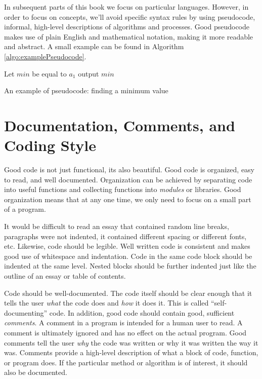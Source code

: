 In subsequent parts of this book we focus on particular languages.  However,
in order to focus on concepts, we'll avoid specific syntax rules by using
\gls{pseudocode}, informal, high-level descriptions of algorithms and 
processes.  Good pseudocode makes use of plain English and mathematical
notation, making it more readable and abstract.  A small example can 
be found in Algorithm \ref{algo:examplePseudocode}.

\begin{algorithm}
Let $min$ be equal to $a_1$ \;
output $min$ \;
\caption{An example of pseudocode: finding a minimum value}
\label{algo:examplePseudocode}
\end{algorithm}

\section{Documentation, Comments, and Coding Style}

Good code is not just functional, its also beautiful.  Good code
is organized, easy to read, and well documented.  Organization
can be achieved by separating code into useful functions and
collecting functions into \emph{modules} or libraries.  Good
organization means that at any one time, we only need to focus
on a small part of a program.  

It would be difficult to read an essay that contained
random line breaks, paragraphs were not indented, it contained
different spacing or different fonts, etc.  Likewise, code should be 
legible.  Well written code is consistent and makes good use
of whitespace and indentation.  Code in the same code block
should be indented at the same level.  Nested blocks should
be further indented just like the outline of an essay or table
of contents.

Code should be well-documented.  The code itself should be
clear enough that it tells the user \emph{what} the code does
and \emph{how} it does it.  This is called ``self-documenting''
code.  In addition, good code should contain good, sufficient
\emph{comments}.  A comment in a program is intended for
a human user to read.  A comment is ultimately ignored and
has no effect on the actual program.  Good comments tell the
user \emph{why} the code was written or why it was written
the way it was.  Comments provide a high-level description of
what a block of code, function, or program does.  If the 
particular method or algorithm is of interest, it should also be
documented.  

